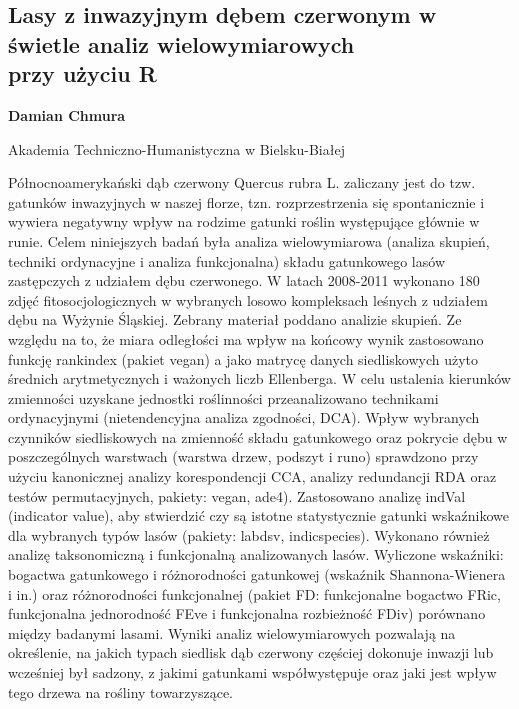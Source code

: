 \documentclass[\main/boa.tex]{subfiles}
\begin{document}
\subsection{Lasy z inwazyjnym dębem czerwonym w świetle analiz wielowymiarowych \\ przy użyciu R }

\begin{minipage}{0.915\textwidth}
	\centering
  {\bf {} Damian Chmura }
\end{minipage}


\begin{affiliations}
\begin{minipage}{0.915\textwidth}
\centering
Akademia Techniczno-Humanistyczna w Bielsku-Białej  \\[-2pt]
\end{minipage}
\end{affiliations}

\vskip 0.3cm

 Północnoamerykański dąb czerwony Quercus rubra L. zaliczany jest do tzw. gatunków inwazyjnych w naszej florze, tzn. rozprzestrzenia się spontanicznie i wywiera negatywny wpływ na rodzime gatunki roślin występujące głównie w runie. Celem niniejszych badań była analiza wielowymiarowa (analiza skupień, techniki ordynacyjne i analiza funkcjonalna) składu gatunkowego lasów zastępczych z udziałem dębu czerwonego. W latach 2008-2011 wykonano 180 zdjęć fitosocjologicznych w wybranych losowo kompleksach leśnych z udziałem dębu na Wyżynie Śląskiej. Zebrany materiał poddano analizie skupień. Ze względu na to, że miara odległości ma wpływ na końcowy wynik zastosowano funkcję rankindex (pakiet vegan) a jako matrycę danych siedliskowych użyto średnich arytmetycznych i ważonych liczb Ellenberga. W celu ustalenia kierunków zmienności uzyskane jednostki roślinności przeanalizowano technikami ordynacyjnymi (nietendencyjna analiza zgodności, DCA). Wpływ wybranych czynników siedliskowych na zmienność składu gatunkowego oraz pokrycie dębu w poszczególnych warstwach (warstwa drzew, podszyt i runo) sprawdzono przy użyciu kanonicznej analizy korespondencji CCA, analizy redundancji RDA oraz testów permutacyjnych, pakiety: vegan, ade4). Zastosowano analizę indVal (indicator value), aby stwierdzić czy są istotne statystycznie gatunki wskaźnikowe dla wybranych typów lasów (pakiety: labdsv, indicspecies). Wykonano również analizę taksonomiczną i funkcjonalną analizowanych lasów. Wyliczone wskaźniki: bogactwa gatunkowego i różnorodności gatunkowej \break (wskaźnik Shannona-Wienera i in.) oraz różnorodności funkcjonalnej (pakiet FD: funkcjonalne bogactwo FRic, funkcjonalna jednorodność FEve i funkcjonalna rozbieżność FDiv) porównano między badanymi lasami. Wyniki analiz wielowymiarowych pozwalają na określenie, na jakich typach siedlisk dąb czerwony częściej dokonuje inwazji lub wcześniej był sadzony, z jakimi gatunkami współwystępuje oraz jaki jest wpływ tego drzewa na rośliny towarzyszące. 
\end{document}
